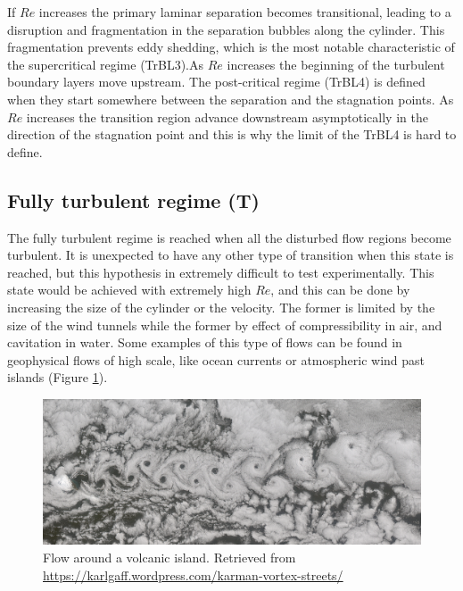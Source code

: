 \documentclass[journal]{new-aiaa}
\begin{document}
If $Re$ increases the primary laminar separation becomes transitional, leading to a disruption and fragmentation in the separation bubbles along the cylinder. This fragmentation prevents eddy shedding, which is the most notable characteristic of the supercritical regime (TrBL3).As $Re$ increases the beginning of the turbulent boundary layers move upstream. The post-critical regime (TrBL4) is defined when they start somewhere between the separation and the stagnation points. As $Re$ increases the transition region advance downstream asymptotically in the direction of the stagnation point and this is why the limit of the TrBL4 is hard to define.




\subsection{Fully turbulent regime (T)}

The fully turbulent regime is reached when all the disturbed flow regions become turbulent. It is unexpected to have any other type of transition when this state is reached, but this hypothesis in extremely difficult to test experimentally. This state would be achieved with extremely high $Re$, and this can be done by increasing the size of the cylinder or the velocity. The former is limited by the size of the wind tunnels while the former by effect of compressibility in air, and cavitation in water. Some examples of this type of flows can be found in geophysical flows of high scale, like ocean currents or atmospheric wind past islands (Figure \ref{fig:T}).

\begin{figure}[H]
\begin{center}
\includegraphics[width=1\textwidth]{Images/federico/Figure07}
\caption{Flow around a volcanic island. Retrieved from  \url{https://karlgaff.wordpress.com/karman-vortex-streets/}}
\label{fig:T}
\end{center}
\end{figure}
\end{document}
